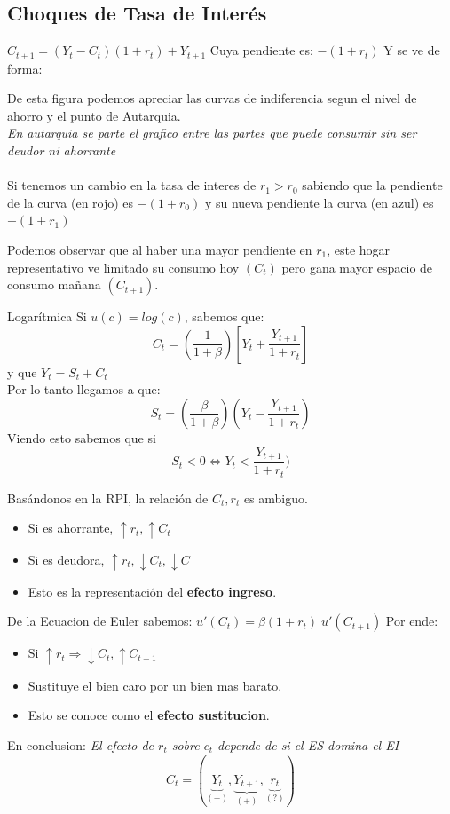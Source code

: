 \documentclass[12pt]{article}
\begin{document}
\subsection{Choques de Tasa de Interés}
$C_{t+1}=(Y_t-C_t)(1+r_t)+Y_{t+1}$
Cuya pendiente es: $-(1+r_t)$
Y se ve de forma: 
\begin{figure} [H]
        \centering 
        
        \label{fig:placeholder}
\end{figure}
De esta figura podemos apreciar las curvas de indiferencia segun el nivel de ahorro y el punto de Autarquia. \\
\textit{En autarquia se parte el grafico entre las partes que puede consumir sin ser deudor ni ahorrante}\\\\
Si tenemos un cambio en la tasa de interes de $r_1>r_0$ sabiendo que la pendiente de la curva (en rojo) es $-(1+r_0)$ y su nueva pendiente la curva (en azul) es $-(1+r_1)$
\begin{figure} [H]
        \centering 
        
        \label{fig:placeholder}
\end{figure}
Podemos observar que al haber una mayor pendiente en $r_1$, este hogar representativo ve limitado su consumo hoy $(C_t)$ pero gana mayor espacio de consumo mañana $(C_{t+1})$. 
\begin{ejemplo}{Logarítmica}
    Si $u(c)=log(c)$, sabemos que: 
    $$C_t=(\frac{1}{1+\beta})[Y_t+\frac{Y_{t+1}}{1+r_t}]$$
    y que $Y_t=S_t+C_t$ \\
    Por lo tanto llegamos a que: 
    $$S_t=(\frac{\beta}{1+\beta})(Y_t-\frac{Y_{t+1}}{1+r_t})$$
    Viendo esto sabemos que si $$S_t<0 \iff Y_t<\frac{Y_{t+1}}{1+r_t})$$
\end{ejemplo}

Basándonos en la RPI, la relación de $C_t, r_t$ es ambiguo. 
\begin{itemize}
    \item Si es ahorrante, $\uparrow r_t, \uparrow C_t$
    \item Si es deudora, $\uparrow r_t, \downarrow C_t,\downarrow C_{}$
    \item Esto es la representación del \textbf{efecto ingreso}. 
\end{itemize}
De la Ecuacion de Euler sabemos: 
$u'(C_t)=\beta (1+r_t)\; u'(C_{t+1})$
Por ende: 
\begin{itemize}
    \item Si $\uparrow r_t\Rightarrow{} \downarrow C_t, \uparrow C_{t+1}$
    \item Sustituye el bien caro por un bien mas barato. 
    \item Esto se conoce como el \textbf{efecto sustitucion}.
\end{itemize}
En conclusion: \textit{El efecto de $r_t$ sobre $c_t$ depende de si el ES domina el EI}
$$C_t=(\underbrace{Y_t}_{(+)},\underbrace{Y_{t+1}}_{(+)},\underbrace{r_t}_{(?)} )$$
\end{document}
